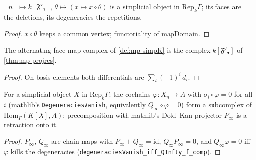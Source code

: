 \begin{definition}\label{def:mp-simpK}
  \leanok
  $[n]\mapsto k[\mathfrak F'_n]$, $\theta\mapsto(x\mapsto x\circ\theta)$ is a simplicial object in $\mathrm{Rep}_k\Gamma$; its faces are the deletions,
  its degeneracies the repetitions.
\end{definition}
\begin{proof}
  \leanok
  $x\circ\theta$ keeps a common vertex; functoriality of $\mathrm{mapDomain}$.
\end{proof}

\begin{theorem}\label{thm:mp-simpK-alt}
  \leanok
  The alternating face map complex of \ref{def:mp-simpK} is the complex $k[\mathfrak F'_\bullet]$ of \ref{thm:mp-projres}.
\end{theorem}
\begin{proof}
  \leanok
  On basis elements both differentials are $\sum_i(-1)^i\,d_i$.
\end{proof}

\begin{definition}\label{def:mp-normcx}
  \leanok
  For a simplicial object $X$ in $\mathrm{Rep}_k\Gamma$: the cochains $\varphi\colon X_n\to A$ with $\sigma_i\circ\varphi=0$ for all $i$ (mathlib's
  \texttt{DegeneraciesVanish}, equivalently $Q_\infty\circ\varphi=0$) form a subcomplex of $\mathrm{Hom}_\Gamma(K[X],A)$; precomposition with
  mathlib's Dold--Kan projector $P_\infty$ is a retraction onto it.
\end{definition}
\begin{proof}
  \leanok
  $P_\infty$, $Q_\infty$ are chain maps with $P_\infty+Q_\infty=\mathrm{id}$, $Q_\infty P_\infty=0$, and $Q_\infty\varphi=0$ iff $\varphi$ kills the
  degeneracies (\texttt{degeneraciesVanish\_iff\_QInfty\_f\_comp}).
\end{proof}

